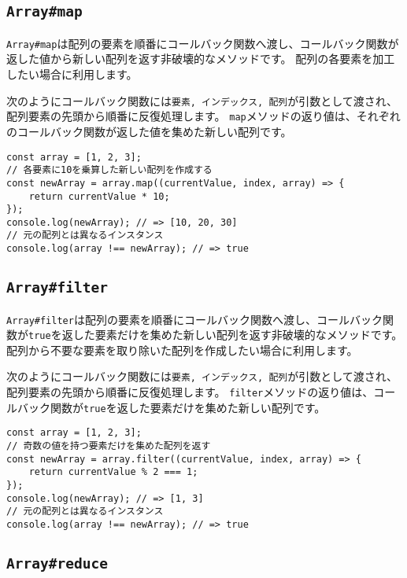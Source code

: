 \hypertarget{array-map}{%
\subsection{\texorpdfstring{\texttt{Array\#map}}{Array\#map}}\label{array-map}}

\texttt{Array\#map}は配列の要素を順番にコールバック関数へ渡し、コールバック関数が返した値から新しい配列を返す非破壊的なメソッドです。
配列の各要素を加工したい場合に利用します。

次のようにコールバック関数には\texttt{要素, インデックス, 配列}が引数として渡され、配列要素の先頭から順番に反復処理します。
\texttt{map}メソッドの返り値は、それぞれのコールバック関数が返した値を集めた新しい配列です。

\begin{lstlisting}
const array = [1, 2, 3];
// 各要素に10を乗算した新しい配列を作成する
const newArray = array.map((currentValue, index, array) => {
    return currentValue * 10;
});
console.log(newArray); // => [10, 20, 30]
// 元の配列とは異なるインスタンス
console.log(array !== newArray); // => true
\end{lstlisting}

\hypertarget{array-filter}{%
\subsection{\texorpdfstring{\texttt{Array\#filter}}{Array\#filter}}\label{array-filter}}

\texttt{Array\#filter}は配列の要素を順番にコールバック関数へ渡し、コールバック関数が\texttt{true}を返した要素だけを集めた新しい配列を返す非破壊的なメソッドです。
配列から不要な要素を取り除いた配列を作成したい場合に利用します。

次のようにコールバック関数には\texttt{要素, インデックス, 配列}が引数として渡され、配列要素の先頭から順番に反復処理します。
\texttt{filter}メソッドの返り値は、コールバック関数が\texttt{true}を返した要素だけを集めた新しい配列です。

\begin{lstlisting}
const array = [1, 2, 3];
// 奇数の値を持つ要素だけを集めた配列を返す
const newArray = array.filter((currentValue, index, array) => {
    return currentValue % 2 === 1;
});
console.log(newArray); // => [1, 3]
// 元の配列とは異なるインスタンス
console.log(array !== newArray); // => true
\end{lstlisting}

\hypertarget{array-reduce}{%
\subsection{\texorpdfstring{\texttt{Array\#reduce}}{Array\#reduce}}\label{array-reduce}}

